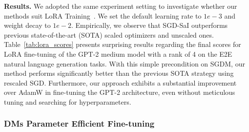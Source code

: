 \textbf{Results.} 
We adopted the same experiment setting to investigate whether our methods suit LoRA Training~\cite{hu2021lora}. We set the default learning rate to \(1e-3\) and weight decay to \(1e-2\). Empirically, we observe that SGD-SaI outperforms previous state-of-the-art (SOTA) scaled optimizers and unscaled ones. Table~\ref{tab:lora_scores} presents surprising results regarding the final scores for LoRA fine-tuning of the GPT-2 medium model with a rank of 4 on the E2E natural language generation tasks. With this simple precondition on SGDM, our method performs significantly better than the previous SOTA strategy using rescaled SGD. Furthermore, our approach exhibits a substantial improvement over AdamW in fine-tuning the GPT-2 architecture, even without meticulous tuning and searching for hyperparameters.

\begin{table}[!ht]
\centering
{}
\caption{This table presents scores for LoRA fine-tuning of GPT-2 medium model on E2E Natural Language Generation (NLG) challenge with different optimizers. SGD-SaI outperforms all scaled and unscaled optimizers on all evaluation metrics. In particular, our method closes the performance gap between SGD and AdamW and reveals its effectiveness in performing block-wise scaling.}

\label{tab:lora_scores}
\end{table}


\subsubsection{DMs Parameter Efficient Fine-tuning}


